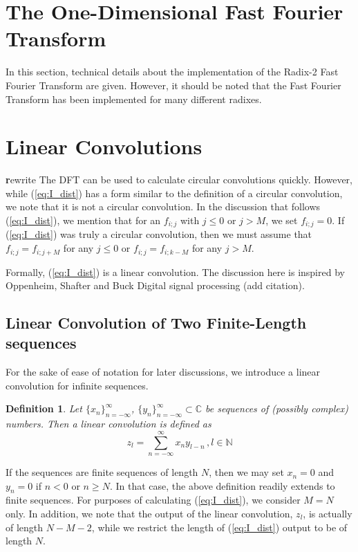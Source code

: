 \documentclass[12pt]{CSUNthesis}
\newtheorem{definition}{Definition}
\begin{document}
\section{The One-Dimensional Fast Fourier Transform}
In this section, technical details about the implementation of the Radix-2 Fast Fourier Transform are given. However, it should be noted that the Fast Fourier Transform has been implemented for many different radixes. 

\section{Linear Convolutions}
{\textbf rewrite} The DFT can be used to calculate circular convolutions quickly. However, while (\ref{eq:I_dist}) has a form similar to the definition of a circular convolution, we note that it is not a circular convolution. In the discussion that follows (\ref{eq:I_dist}), we mention that for an $f_{i;j}$ with $j \leq 0$ or $j > M$, we set $f_{i;j}=0$. If (\ref{eq:I_dist}) was truly a circular convolution, then we must assume that $f_{i;j}=f_{i;j+M}$ for any $j \leq 0$ or $f_{i;j}=f_{i;k-M}$ for any $j > M$. 

Formally, (\ref{eq:I_dist}) is a linear convolution. The discussion here is inspired by Oppenheim, Shafter and Buck Digital signal processing (add citation).

\subsection{Linear Convolution of Two Finite-Length sequences}
For the sake of ease of notation for later discussions, we introduce a linear convolution for infinite sequences. 
\begin{definition}
Let $\{x_n\}_{n=-\infty}^{\infty}$, $\{y_n\}_{n=-\infty}^{\infty} \subset \mathbb{C}$ be sequences of (possibly complex) numbers. Then a linear convolution is defined as 
\begin{equation}
\label{eq:idft_1d}
z_{l}=\sum_{n=-\infty}^{\infty} x_{n}y_{l-n}\, , l \in \mathbb{N}
\end{equation}
\end{definition}


If the sequences are finite sequences of length $N$, then we may set $x_n=0$ and $y_n=0$ if $n<0$ or $n \geq N$. In that case, the above definition readily extends to finite sequences.
For purposes of calculating (\ref{eq:I_dist}), we consider $M=N$ only. In addition, we note that the output of the linear convolution, $z_l$, is actually of length $N-M-2$, while we restrict the length of (\ref{eq:I_dist}) output to be of length $N$.
\end{document}
